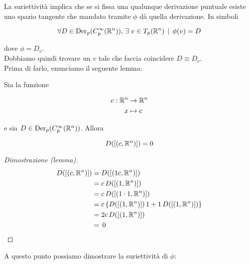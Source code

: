 La suriettività implica che se si fissa una qualunque derivazione puntuale esiste uno spazio tangente che mandato tramite $ \phi $ dà quella derivazione. In simboli

\begin{equation}
	\forall D \in \operatorname{Der}_{p} (C_{p}^{\infty}(\mathbb{R}^{n})), \, \exists \; v \in T_{p}(\mathbb{R}^{n}) \, \mid \, \phi(v) = D
\end{equation}

dove $ \phi = D_{v} $.\\
Dobbiamo quindi trovare un $ v $ tale che faccia coincidere $ D \equiv D_{v} $.\\
Prima di farlo, enunciamo il seguente lemma:

\begin{lemma}
	Sia la funzione
	
	\begin{align}
		\begin{split}
			c : \mathbb{R}^{n} &\to \mathbb{R}^{n}\\
			x &\mapsto c
		\end{split}
	\end{align}

	e sia $ D \in \operatorname{Der}_{p} (C_{p}^{\infty}(\mathbb{R}^{n})) $. Allora
	
	\begin{equation}
		D([(c,\mathbb{R}^{n})]) = 0
	\end{equation}
\end{lemma}

\begin{proof}[Dimostrazione (lemma)]
	\begin{align}
		\begin{split}
			D([(c,\mathbb{R}^{n})]) &= D([(1 c,\mathbb{R}^{n})])\\
			&= c \, D([(1,\mathbb{R}^{n})])\\
			&= c \, D([(1 \cdot 1,\mathbb{R}^{n})])\\
			&= c \, \{D([(1,\mathbb{R}^{n})]) \, 1 + 1 \, D([(1,\mathbb{R}^{n})])\}\\
			&= 2 c \, D([(1,\mathbb{R}^{n})])\\
			&= \, 0
		\end{split}
	\end{align}
\end{proof}

A questo punto possiamo dimostrare la suriettività di $ \phi $:

